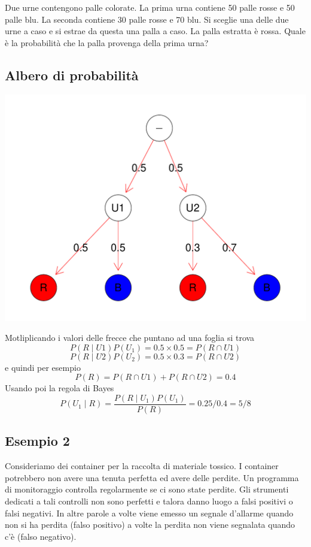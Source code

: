 \documentclass[onecolumn,12pt]{book}\usepackage[]{graphicx}\usepackage[]{color}
\makeatletter
\def\maxwidth{ %
  \ifdim\Gin@nat@width>\linewidth
    \linewidth
  \else
    \Gin@nat@width
  \fi
}
\newenvironment{knitrout}{}{} %
\makeatother
\begin{document}
Due urne contengono palle colorate. La prima urna contiene  50
palle rosse e 50 palle blu. La seconda contiene 30 palle rosse e 70 blu. Si sceglie una delle due urne a caso e si estrae da questa una palla a caso.  
La palla   estratta  è rossa. 
Quale è la probabilità che la palla provenga della prima urna?



\subsection{Albero di probabilità}

\begin{knitrout}
\color{fgcolor}
\includegraphics[width=\maxwidth]{figure/unnamed-chunk-18-1} 

\end{knitrout}

Motliplicando i valori delle frecce che puntano ad una foglia si trova
$$P(R\mid U1)P(U_1)=0.5\times 0.5=P(R\cap U1)$$
$$P(R\mid U2)P(U_2)=0.5\times 0.3=P(R\cap U2)$$
e quindi per esempio
$$P(R)=P(R\cap U1)+P(R\cap U2)=0.4$$
Usando poi la regola di Bayes
$$P(U_1\mid R)=\dfrac{P(R\mid U_1)P(U_1)}{P(R)}=0.25/0.4=5/8$$


\subsection{Esempio 2}

Consideriamo dei container per la raccolta di materiale tossico. I container potrebbero non avere una tenuta perfetta ed avere delle perdite. Un programma di monitoraggio  controlla regolarmente se ci sono state perdite. Gli strumenti dedicati a tali controlli non sono perfetti e talora danno luogo a falsi positivi o falsi negativi.  In altre parole a volte viene emesso un segnale d'allarme quando non si ha perdita (falso positivo) a volte la perdita non viene segnalata quando c'è (falso negativo).
\end{document}

